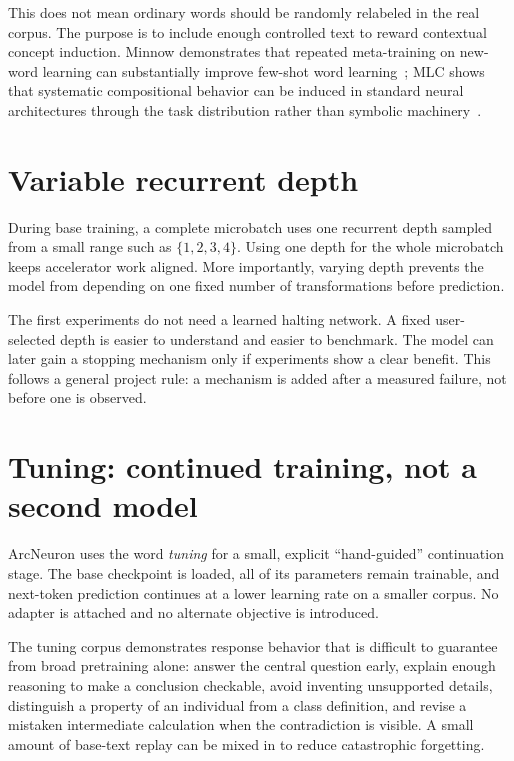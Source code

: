 \documentclass[10pt]{article}
\begin{document}
This does not mean ordinary words should be randomly relabeled in the real corpus. The purpose is to include enough controlled text to reward contextual concept induction. Minnow demonstrates that repeated meta-training on new-word learning can substantially improve few-shot word learning~\cite{wang2025minnow}; MLC shows that systematic compositional behavior can be induced in standard neural architectures through the task distribution rather than symbolic machinery~\cite{lake2023mlc}.

\section{Variable recurrent depth}

During base training, a complete microbatch uses one recurrent depth sampled from a small range such as $\{1,2,3,4\}$. Using one depth for the whole microbatch keeps accelerator work aligned. More importantly, varying depth prevents the model from depending on one fixed number of transformations before prediction.

The first experiments do not need a learned halting network. A fixed user-selected depth is easier to understand and easier to benchmark. The model can later gain a stopping mechanism only if experiments show a clear benefit. This follows a general project rule: a mechanism is added after a measured failure, not before one is observed.

\section{Tuning: continued training, not a second model}

ArcNeuron uses the word \emph{tuning} for a small, explicit ``hand-guided'' continuation stage. The base checkpoint is loaded, all of its parameters remain trainable, and next-token prediction continues at a lower learning rate on a smaller corpus. No adapter is attached and no alternate objective is introduced.

The tuning corpus demonstrates response behavior that is difficult to guarantee from broad pretraining alone: answer the central question early, explain enough reasoning to make a conclusion checkable, avoid inventing unsupported details, distinguish a property of an individual from a class definition, and revise a mistaken intermediate calculation when the contradiction is visible. A small amount of base-text replay can be mixed in to reduce catastrophic forgetting.
\end{document}

